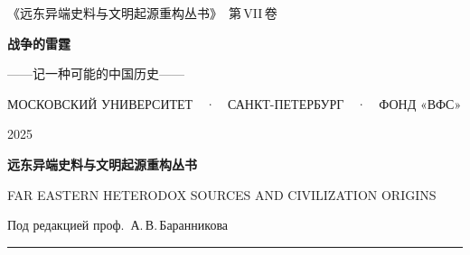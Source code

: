 \clearpage
\makeatletter\@mainmatterfalse\makeatother
{}
\pagestyle{frontmatterpage}

\thispagestyle{empty}
\begingroup
\centering
\vspace*{7mm}

{\sffamily\footnotesize\color{pencil}
《远东异端史料与文明起源重构丛书》\ 第\,VII\,卷\par}

\vspace{27mm}

{\fontsize{26pt}{34pt}\selectfont\bfseries 战争的雷霆\par}
\vspace{8mm}
{\large ——记一种可能的中国历史——\par}

\vfill

{\sffamily\footnotesize\color{pencil}
МОСКОВСКИЙ УНИВЕРСИТЕТ\ \ ·\ \ САНКТ-ПЕТЕРБУРГ\ \ ·\ \ ФОНД «ВФС»\par}
\vspace{4mm}
{\footnotesize\color{pencil} 2025\par}
\endgroup
\clearpage

\thispagestyle{empty}
\begingroup
\centering
\vspace*{9mm}

{\sffamily\large\bfseries 远东异端史料与文明起源重构丛书\par}
\vspace{3mm}
{\sffamily\footnotesize\color{pencil}
FAR EASTERN HETERODOX SOURCES AND CIVILIZATION ORIGINS\par}
\vspace{1mm}
{\sffamily\footnotesize\color{pencil}
Под редакцией проф.\ А.\,В.\,Баранникова\par}

\vspace{5mm}
{\color{rulegrey}\rule{52mm}{0.4pt}}
\vspace{9mm}

